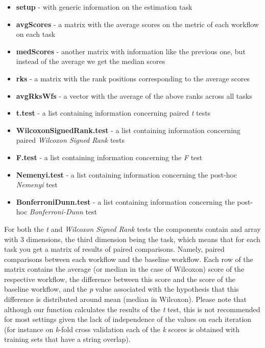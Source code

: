\documentclass[10pt,a4paper]{article}\usepackage[]{graphicx}\usepackage[]{color}
\begin{document}
\begin{itemize}
\item \textbf{setup} - with generic information on the estimation task
  \item \textbf{avgScores} - a matrix with the average scores on the metric of each workflow on each task
  \item \textbf{medScores} - another matrix with information like the previous one, but instead of the average we get the median scores
  \item \textbf{rks} - a matrix with the rank positions corresponding to the average scores
  \item \textbf{avgRksWfs} - a vector with the average of the above ranks across all tasks
  \item \textbf{t.test} - a list containing information concerning paired \textit{t} tests
  \item \textbf{WilcoxonSignedRank.test} - a list containing information concerning paired \textit{Wilcoxon Signed Rank} tests
  \item \textbf{F.test} - a list containing information concerning the \textit{F} test
  \item \textbf{Nemenyi.test} - a list containing information concerning the post-hoc \textit{Nemenyi} test
  \item \textbf{BonferroniDunn.test} - a list containing information concerning the post-hoc \textit{Bonferroni-Dunn} test
\end{itemize}

For both the \textit{t} and \textit{Wilcoxon Signed Rank} tests the components contain and array with 3 dimensions, the third dimension being the task, which means that for each task you get a matrix of results of paired comparisons. Namely, paired comparisons between each workflow and the baseline workflow. Each row of the matrix contains the average (or median in the case of Wilcoxon) score of the respective workflow, the difference between this score and the score of the baseline workflow, and the \textit{p} value associated with the hypothesis that this difference is distributed around mean (median in Wilcoxon). Please note that although our function calculates the results of the \textit{t} test, this is not recommended for most settings given the lack of independence of the values on each iteration (for instance on \textit{k}-fold cross validation each of the \textit{k} scores is obtained with training sets that have a string overlap).
\end{document}
